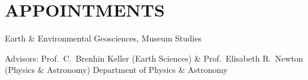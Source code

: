 \section{APPOINTMENTS}

Earth \& Environmental Geosciences, Museum Studies


Advisors: Prof.~C.~Brenhin Keller (Earth Sciences) \& Prof.~Elisabeth R.~Newton (Physics \& Astronomy)
Department of Physics \& Astronomy



